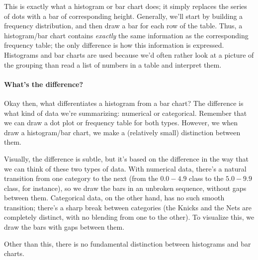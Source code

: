 This is exactly what a histogram or bar chart does; it simply replaces the series of dots with a bar of corresponding height.  Generally, we'll start by building a frequency distribution, and then draw a bar for each row of the table.  Thus, a histogram/bar chart contains \emph{exactly} the same information as the corresponding frequency table; the only difference is how this information is expressed.  Histograms and bar charts are used because we'd often rather look at a picture of the grouping than read a list of numbers in a table and interpret them.

\paragraph{What's the difference?} Okay then, what differentiates a histogram from a bar chart?  The difference is what kind of data we're summarizing: numerical or categorical.  Remember that we can draw a dot plot or frequency table for both types.  However, we when draw a histogram/bar chart, we make a (relatively small) distinction between them.

Visually, the difference is subtle, but it's based on the difference in the way that we can think of these two types of data.  With numerical data, there's a natural transition from one category to the next (from the $0.0 - 4.9$ class to the $5.0 - 9.9$ class, for instance), so we draw the bars in an unbroken sequence, without gaps between them.  Categorical data, on the other hand, has no such smooth transition; there's a sharp break between categories (the Knicks and the Nets are completely distinct, with no blending from one to the other).  To visualize this, we draw the bars with gaps between them.

Other than this, there is no fundamental distinction between histograms and bar charts.\\

